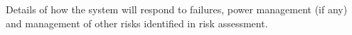 Details of how the system will respond to failures, power management (if any) and management of other risks identified in risk assessment.